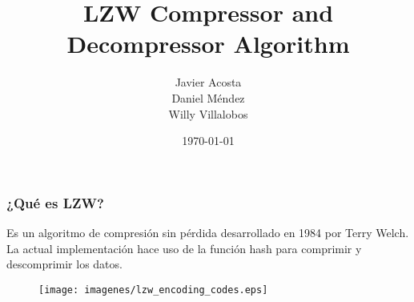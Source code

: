 \documentclass{beamer}
\title[LZW CoDec]{LZW Compressor and Decompressor Algorithm} %
\author{Javier Acosta\\Daniel Méndez\\Willy Villalobos} %
\institute[UCR] %
{
Universidad de Costa Rica \\ %
\medskip
\textit{} %
}
\date{\today} %
\begin{document}
	\begin{frame}
		\titlepage %
	\end{frame}






	\begin{frame}
		\frametitle{¿Qué es LZW?}
		Es un algoritmo de compresión sin pérdida desarrollado en 1984 por Terry Welch. La actual implementación hace uso de la función hash para comprimir y descomprimir los datos.

		\begin{figure}
			\texttt{[image: imagenes/lzw\_encoding\_codes.eps]}
		\end{figure}

	\end{frame}
\end{document}
